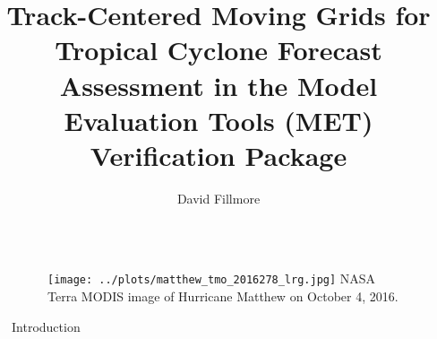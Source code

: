 \documentclass[final]{beamer}
\title{
Track-Centered Moving Grids for Tropical Cyclone Forecast Assessment
in the Model Evaluation Tools (MET) Verification Package} %
\author{David Fillmore} %
\institute{National Center for Atmospheric Research,
Research Applications Lab} %
\newlength{\sepwid}
\newlength{\onecolwid}
\begin{document}

\setlength{\belowcaptionskip}{2ex} %
\setlength\belowdisplayshortskip{2ex} %

\begin{frame}[t] %

\begin{columns}[t] %

\begin{column}{\sepwid}\end{column} %

\begin{column}{\onecolwid} %




\begin{figure}
\texttt{[image: ../plots/matthew\_tmo\_2016278\_lrg.jpg]}
{\small NASA Terra MODIS image of Hurricane Matthew on October 4, 2016.}
\end{figure}

\begin{block}{Introduction}

\end{block}



\end{column}
\end{columns}
\end{frame}
\end{document}
